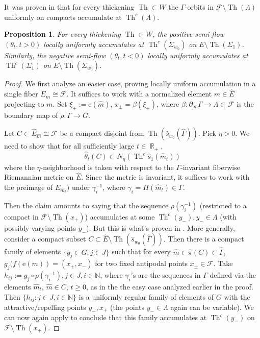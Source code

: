 \documentclass[12pt]{amsbook}%
\newtheorem{prop}[thm]{Proposition}
\theoremstyle{definition}
\theoremstyle{remark}
\numberwithin{section}{chapter}
\numberwithin{subsection}{section}
\numberwithin{figure}{chapter}
\DeclareMathOperator{\Th}{Th}
\DeclareMathOperator{\R}{\mathbb{R}}
\def\bN{{\mathbb{N}}}
\def\cF{{\mathscr{F}}}
\def\re{\mathrm{e}}
\def\Ga{\Gamma}
\def\ga{\gamma}
\def\La{\Lambda}
\def\geo{\partial_\infty}
\begin{document}
{{It was proven in \cite[Corollary 6.3]{KLP18A} that for every thickening 
$\Th\subset W$ the $\Ga$-orbits in $\cF \setminus \Th(\La)$ uniformly on compacts accumulate at 
$\Th^c(\La)$.

\begin{prop}
For every thickening $\Th\subset W$, the positive semi-flow $(\theta_t, t>0)$ locally uniformly accumulates at 
$\Th^c(\Sigma_{w_0})$ on $E\setminus \Th(\Sigma_1)$. Similarly, the negative semi-flow 
$(\theta_t, t< 0)$ locally uniformly accumulates at 
$\Th^c(\Sigma_{1})$ on $E\setminus \Th(\Sigma_{w_0})$. 
\end{prop}  
\begin{proof} We first analyze an easier case, proving 
locally uniform accumulation in a single fiber $E_m\cong \cF$. It suffices to work with a normalized element 
$\hat m\in \widehat E$ projecting to $m$. Set  
$\xi_\pm:= \re(\hat m)$, $x_\pm=\beta(\xi_\pm)$, where $\beta: \geo \Ga\to \La\subset \cF$ is the boundary map of $\rho: \Ga\to G$. 

Let $C\subset \widehat E_{\hat m}\cong \cF$ be a compact disjoint from  
$\Th(\hat s_{w_0}(\widehat\Ga))$. Pick $\eta>0$. We need to show that for all sufficiently large $t\in \R_+$, 
$$
\hat\theta_t(C)\subset N_\eta(\Th^c \hat s_{1}(\hat m_t) )$$
where the $\eta$-neighborhood is taken with respect to the $\Ga$-invariant fiberwise Riemannian metric on $\widehat E$. 
Since the metric is invariant, it suffices to work with the preimage of $E_{\hat m_t})$ under $\gamma_i^{-1}$, where $\gamma_i= \Pi(\hat m_t)\in \Ga$. 



Then the claim amounts to saying that the sequence $\rho(\ga^{-1}_i)$ (restricted to a compact in $\cF \setminus \Th(x_+)$) 
accumulates  at some $\Th^c(y_-), y_-\in \La$ (with possibly varying points $y_-$). But this is what's proven in 
\cite[Corollary 6.3]{KLP18A}. More generally, consider a compact subset $C\subset \widehat E \setminus \Th(\hat{s}_{w_0}(\widehat \Ga))$. 
Then there is a compact family of elements $\{g_j\in G: j\in J\}$ such that for every $\hat m\in \hat\pi(C)\subset \widehat\Ga$, $g_j(f(\re(m))=(x_+,x_-)$ for 
two fixed antipodal points $x_\pm \in \cF$.  Take $h_{ij}:=g_j\circ \rho(\gamma^{-1}_i), j\in J, i\in \bN$, where $\gamma_i$'s are the sequences in $\Ga$ defined 
via the elements $\hat m_t$, $\hat m\in C$, $t\geqslant 0$, as in the   the easy case analyzed earlier in the proof. 
Then $\{h_{ij}: j\in J, i\in \bN\}$ is a uniformly regular family of elements of $G$ with the 
attractive/repelling points $y_-, x_+$ (the points $y_-\in \La$ again can be variable). 
We can now again apply \cite[Corollary 6.3]{KLP18A} to conclude that this family accumulates at  $\Th^c(y_-)$ on $\cF \setminus \Th(x_+)$. 
\end{proof}
 
}}
\end{document}
